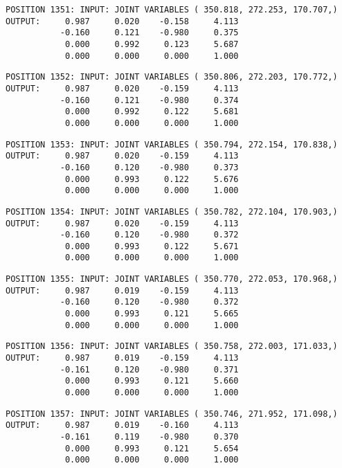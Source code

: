 \begin{verbatim}
POSITION 1351: INPUT: JOINT VARIABLES ( 350.818, 272.253, 170.707,)
OUTPUT:     0.987     0.020    -0.158     4.113
           -0.160     0.121    -0.980     0.375
            0.000     0.992     0.123     5.687
            0.000     0.000     0.000     1.000
\end{verbatim} \pagebreak[1]\begin{verbatim}
POSITION 1352: INPUT: JOINT VARIABLES ( 350.806, 272.203, 170.772,)
OUTPUT:     0.987     0.020    -0.159     4.113
           -0.160     0.121    -0.980     0.374
            0.000     0.992     0.122     5.681
            0.000     0.000     0.000     1.000
\end{verbatim} \pagebreak[1]\begin{verbatim}
POSITION 1353: INPUT: JOINT VARIABLES ( 350.794, 272.154, 170.838,)
OUTPUT:     0.987     0.020    -0.159     4.113
           -0.160     0.120    -0.980     0.373
            0.000     0.993     0.122     5.676
            0.000     0.000     0.000     1.000
\end{verbatim} \pagebreak[1]\begin{verbatim}
POSITION 1354: INPUT: JOINT VARIABLES ( 350.782, 272.104, 170.903,)
OUTPUT:     0.987     0.020    -0.159     4.113
           -0.160     0.120    -0.980     0.372
            0.000     0.993     0.122     5.671
            0.000     0.000     0.000     1.000
\end{verbatim} \pagebreak[1]\begin{verbatim}
POSITION 1355: INPUT: JOINT VARIABLES ( 350.770, 272.053, 170.968,)
OUTPUT:     0.987     0.019    -0.159     4.113
           -0.160     0.120    -0.980     0.372
            0.000     0.993     0.121     5.665
            0.000     0.000     0.000     1.000
\end{verbatim} \pagebreak[1]\begin{verbatim}
POSITION 1356: INPUT: JOINT VARIABLES ( 350.758, 272.003, 171.033,)
OUTPUT:     0.987     0.019    -0.159     4.113
           -0.161     0.120    -0.980     0.371
            0.000     0.993     0.121     5.660
            0.000     0.000     0.000     1.000
\end{verbatim} \pagebreak[1]\begin{verbatim}
POSITION 1357: INPUT: JOINT VARIABLES ( 350.746, 271.952, 171.098,)
OUTPUT:     0.987     0.019    -0.160     4.113
           -0.161     0.119    -0.980     0.370
            0.000     0.993     0.121     5.654
            0.000     0.000     0.000     1.000
\end{verbatim} \pagebreak[1]\begin{verbatim}

\end{verbatim}
